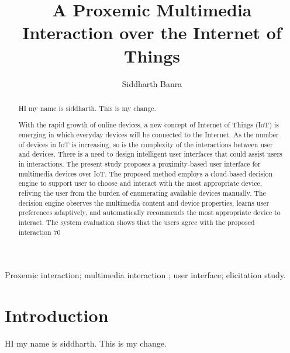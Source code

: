 \documentclass[]{IEEEphot}
\begin{document}
\title{A Proxemic Multimedia Interaction over the
Internet of Things}

\author{Siddharth Banra}


%

\maketitle




\begin{abstract}
HI my name is siddharth. This is my change.



With the rapid growth of online devices, a new concept of
Internet of Things (IoT) is emerging in which everyday devices will be
connected to the Internet. As the number of devices in IoT is increasing,
so is the complexity of the interactions between user and devices. There
is a need to design intelligent user interfaces that could assist users in
interactions. The present study proposes a proximity-based user interface for multimedia devices over IoT. The proposed method employs a
cloud-based decision engine to support user to choose and interact with
the most appropriate device, reliving the user from the burden of enumerating available devices manually. The decision engine observes the
multimedia content and device properties, learns user preferences adaptively, and automatically recommends the most appropriate device to
interact. The system evaluation shows that the users agree with the proposed interaction 70%
\end{abstract}

\begin{IEEEkeywords}
Proxemic interaction; multimedia interaction ; user interface; elicitation study.
\end{IEEEkeywords}

\section{Introduction}
HI my name is siddharth. This is my change.
\end{document}

